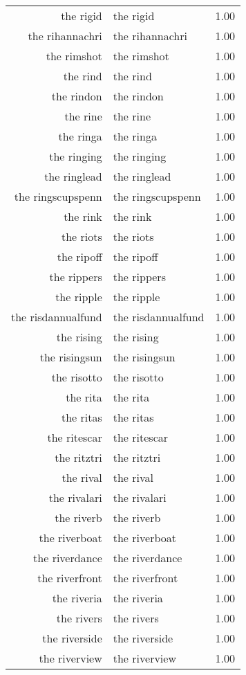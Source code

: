 \begin{table}[ht]
\begin{tabular}{rlr}
  the rigid & the rigid & 1.00 \\ 
  the rihannachri & the rihannachri & 1.00 \\ 
  the rimshot & the rimshot & 1.00 \\ 
  the rind & the rind & 1.00 \\ 
  the rindon & the rindon & 1.00 \\ 
  the rine & the rine & 1.00 \\ 
  the ringa & the ringa & 1.00 \\ 
  the ringing & the ringing & 1.00 \\ 
  the ringlead & the ringlead & 1.00 \\ 
  the ringscupspenn & the ringscupspenn & 1.00 \\ 
  the rink & the rink & 1.00 \\ 
  the riots & the riots & 1.00 \\ 
  the ripoff & the ripoff & 1.00 \\ 
  the rippers & the rippers & 1.00 \\ 
  the ripple & the ripple & 1.00 \\ 
  the risdannualfund & the risdannualfund & 1.00 \\ 
  the rising & the rising & 1.00 \\ 
  the risingsun & the risingsun & 1.00 \\ 
  the risotto & the risotto & 1.00 \\ 
  the rita & the rita & 1.00 \\ 
  the ritas & the ritas & 1.00 \\ 
  the ritescar & the ritescar & 1.00 \\ 
  the ritztri & the ritztri & 1.00 \\ 
  the rival & the rival & 1.00 \\ 
  the rivalari & the rivalari & 1.00 \\ 
  the riverb & the riverb & 1.00 \\ 
  the riverboat & the riverboat & 1.00 \\ 
  the riverdance & the riverdance & 1.00 \\ 
  the riverfront & the riverfront & 1.00 \\ 
  the riveria & the riveria & 1.00 \\ 
  the rivers & the rivers & 1.00 \\ 
  the riverside & the riverside & 1.00 \\ 
  the riverview & the riverview & 1.00 \\ 

\end{tabular}
\end{table}

